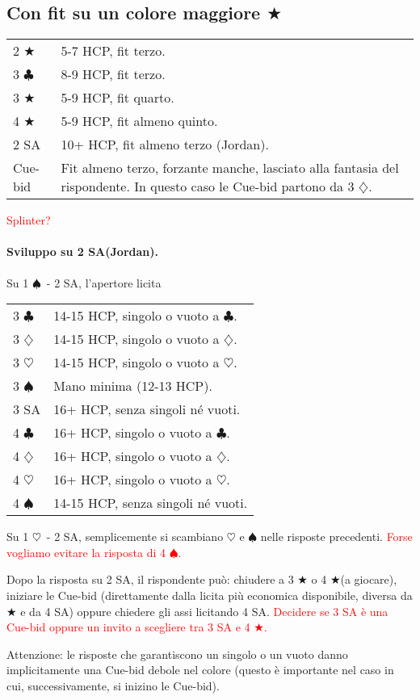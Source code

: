 \documentclass[a4paper,10pt]{article}
\renewcommand{\c}{$\clubsuit$\xspace}
\renewcommand{\d}{$\diamondsuit$\xspace}
\newcommand{\h}{$\heartsuit$\xspace}
\newcommand{\s}{$\spadesuit$\xspace}
\renewcommand{\j}{$\bigstar$\xspace}
\newcommand{\sa}{SA\xspace}
\newcommand{\smallspace}{\vskip0.3cm}
\newcommand{\note}[1]{\textcolor{red}{#1}}
\newenvironment{twocol}
  {\smallspace\noindent\begin{tabular}{l p{0.8\textwidth}}}
  {\end{tabular}\smallspace}
\begin{document}
\subsection{Con fit su un colore maggiore \j}
\begin{twocol}
 2 \j  & 5-7 HCP, fit terzo.\\
 3 \c & 8-9 HCP, fit terzo.\\
 3 \j  & 5-9 HCP, fit quarto.\\
 4 \j  & 5-9 HCP, fit almeno quinto.\\
 2 \sa & 10+ HCP, fit almeno terzo (Jordan).\\
 Cue-bid & Fit almeno terzo, forzante manche, lasciato alla fantasia del rispondente. In questo caso le Cue-bid partono da 3 \d.
\end{twocol}
\note{Splinter?}

\paragraph{Sviluppo su 2 \sa (Jordan).} Su 1 \s\ - 2 \sa, l'apertore licita
\begin{twocol}
 3 \c & 14-15 HCP, singolo o vuoto a \c.\\
 3 \d & 14-15 HCP, singolo o vuoto a \d.\\
 3 \h & 14-15 HCP, singolo o vuoto a \h.\\
 3 \s & Mano minima (12-13 HCP).\\
 3 \sa & 16+ HCP, senza singoli né vuoti.\\
 4 \c & 16+ HCP, singolo o vuoto a \c.\\
 4 \d & 16+ HCP, singolo o vuoto a \d.\\
 4 \h & 16+ HCP, singolo o vuoto a \h.\\
 4 \s & 14-15 HCP, senza singoli né vuoti.
\end{twocol}

\noindent Su 1 \h\ - 2 \sa, semplicemente si scambiano \h e \s nelle risposte precedenti. \note{Forse vogliamo evitare la risposta di 4 \s.}

Dopo la risposta su 2 \sa, il rispondente può: chiudere a 3 \j o 4 \j (a giocare), iniziare le Cue-bid (direttamente dalla licita più economica disponibile, diversa da \j e da 4 \sa) oppure chiedere gli assi licitando 4 \sa. \note{Decidere se 3 \sa è una Cue-bid oppure un invito a scegliere tra 3 \sa e 4 \j.}

Attenzione: le risposte che garantiscono un singolo o un vuoto danno implicitamente una Cue-bid debole nel colore (questo è importante nel caso in cui, successivamente, si inizino le Cue-bid).
\end{document}
